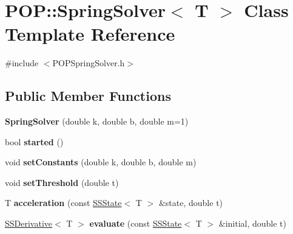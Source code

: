 \hypertarget{class_p_o_p_1_1_spring_solver}{}\section{P\+OP\+:\+:Spring\+Solver$<$ T $>$ Class Template Reference}
\label{class_p_o_p_1_1_spring_solver}


{\ttfamily \#include $<$P\+O\+P\+Spring\+Solver.\+h$>$}

\subsection*{Public Member Functions}
\begin{DoxyCompactItemize}
\item 
\mbox{\label{class_p_o_p_1_1_spring_solver_a96cc1e1b11e2ad7eda996a237934ee23}} 
{\bfseries Spring\+Solver} (double k, double b, double m=1)
\item 
\mbox{\label{class_p_o_p_1_1_spring_solver_aa7a738e12fecab509749095fa676ead5}} 
bool {\bfseries started} ()
\item 
\mbox{\label{class_p_o_p_1_1_spring_solver_ac0232661f5dd1ba0c7245a1ae235a069}} 
void {\bfseries set\+Constants} (double k, double b, double m)
\item 
\mbox{\label{class_p_o_p_1_1_spring_solver_a1456ab3b2007d7baf8c7e19ed11398f4}} 
void {\bfseries set\+Threshold} (double t)
\item 
\mbox{\label{class_p_o_p_1_1_spring_solver_af7d86a44923abf9bf92db308dc217612}} 
T {\bfseries acceleration} (const \mbox{\hyperlink{struct_p_o_p_1_1_s_s_state}{S\+S\+State}}$<$ T $>$ \&state, double t)
\item 
\mbox{\label{class_p_o_p_1_1_spring_solver_a2e2cc9a5a0c9f0181b6e38e2957c0e34}} 
\mbox{\hyperlink{struct_p_o_p_1_1_s_s_derivative}{S\+S\+Derivative}}$<$ T $>$ {\bfseries evaluate} (const \mbox{\hyperlink{struct_p_o_p_1_1_s_s_state}{S\+S\+State}}$<$ T $>$ \&initial, double t)
\item 
\mbox{\label{class_p_o_p_1_1_spring_solver_a11481fb1175c414f34632fec46d7a485}} 

\end{DoxyCompactItemize}
